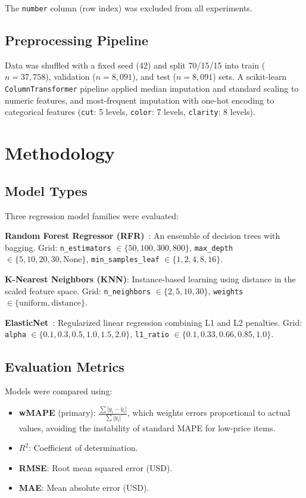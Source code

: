 \documentclass[conference]{IEEEtran}
\begin{document}
The \texttt{number} column (row index) was excluded from all experiments.

\subsection{Preprocessing Pipeline}
Data was shuffled with a fixed seed (42) and split 70/15/15 into train ($n=37,758$), validation ($n=8,091$), and test ($n=8,091$) sets. A scikit-learn \texttt{ColumnTransformer} pipeline applied median imputation and standard scaling to numeric features, and most-frequent imputation with one-hot encoding to categorical features (\texttt{cut}: 5 levels, \texttt{color}: 7 levels, \texttt{clarity}: 8 levels).

\section{Methodology}

\subsection{Model Types}
Three regression model families were evaluated:

\textbf{Random Forest Regressor (RFR)}~\cite{b6}: An ensemble of decision trees with bagging. Grid: \texttt{n\_estimators} $\in \{50, 100, 300, 800\}$, \texttt{max\_depth} $\in \{5, 10, 20, 30, \text{None}\}$, \texttt{min\_samples\_leaf} $\in \{1, 2, 4, 8, 16\}$.

\textbf{K-Nearest Neighbors (KNN)}: Instance-based learning using distance in the scaled feature space. Grid: \texttt{n\_neighbors} $\in \{2, 5, 10, 30\}$, \texttt{weights} $\in \{\text{uniform}, \text{distance}\}$.

\textbf{ElasticNet}~\cite{b7}: Regularized linear regression combining L1 and L2 penalties. Grid: \texttt{alpha} $\in \{0.1, 0.3, 0.5, 1.0, 1.5, 2.0\}$, \texttt{l1\_ratio} $\in \{0.1, 0.33, 0.66, 0.85, 1.0\}$.

\subsection{Evaluation Metrics}
Models were compared using:
\begin{itemize}
\item \textbf{wMAPE} (primary): $\frac{\sum |y_i - \hat{y}_i|}{\sum |y_i|}$, which weights errors proportional to actual values, avoiding the instability of standard MAPE for low-price items.
\item \textbf{$R^2$}: Coefficient of determination.
\item \textbf{RMSE}: Root mean squared error (USD).
\item \textbf{MAE}: Mean absolute error (USD).
\end{itemize}
\end{document}

